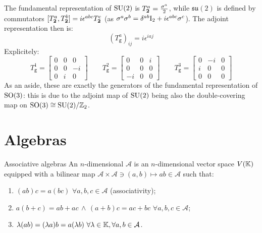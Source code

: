The fundamental representation of $ \mathrm{SU}(2) $ is $ T^a_{\mathbf{2}} = \frac{\sigma^a}{2} $, while $ \mathfrak{su}(2) $ is defined by commutators $ [T^a_{\mathbf{2}},T^b_{\mathbf{2}}] = i \epsilon^{abc} T^c_{\mathbf{2}} $ (as $ \sigma^a \sigma^b = \delta^{ab} \mathrm{I}_2 + i \epsilon^{abc} \sigma^c $). The adjoint representation then is:
\begin{equation}
  (T^a_\mathtt{g})_{ij} = i \epsilon^{iaj}
\end{equation}
Explicitely:
\begin{equation*}
  T^1_\mathtt{g} =
  \begin{bmatrix}
    0 & 0 & 0 \\
    0 & 0 & -i \\
    0 & i & 0
  \end{bmatrix}
  \qquad
  T^2_\mathtt{g} =
  \begin{bmatrix}
    0 & 0 & i \\
    0 & 0 & 0 \\
    -i & 0 & 0
  \end{bmatrix}
  \qquad
  T^3_\mathtt{g} =
  \begin{bmatrix}
    0 & -i & 0 \\
    i & 0 & 0 \\
    0 & 0 & 0
  \end{bmatrix}
\end{equation*}
As an aside, these are exactly the generators of the fundamental representation of $ \mathrm{SO}(3) $: this is due to the adjoint map of $ \mathrm{SU}(2) $ being also the double-covering map on $ \mathrm{SO}(3) \cong \mathrm{SU}(2) / \mathbb{Z}_2 $.

\section{Algebras}

\begin{definition}{Associative algebras}{}
  An $ n $-dimensional  $ \mathcal{A} $ is an $ n $-dimensional vector space $ V(\mathbb{K}) $ equipped with a bilinear map $ \mathcal{A} \times \mathcal{A} \ni (a,b) \mapsto ab \in \mathcal{A} $ such that:
  \begin{enumerate}
    \item $ (ab)c = a(bc) \,\,\forall a,b,c \in \mathcal{A} $ (associativity);
    \item $ a(b + c) = ab + ac \,\land\, (a + b)c = ac + bc \,\,\forall a,b,c \in \mathcal{A} $;
    \item $ \lambda (ab) = (\lambda a)b = a(\lambda b) \,\,\forall \lambda \in \mathbb{K}, \forall a,b \in \mathcal{A} $.
  \end{enumerate}
\end{definition}

